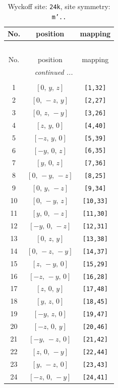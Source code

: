 \documentclass[fleqn,8pt]{jsarticle}
\begin{document}
\begin{longtable}{ccc}
\caption{Wyckoff site: {\tt 24k}, site symmetry: {\tt m'..}}
 \\
 \hline \hline
No. & position & mapping \\ \hline \endfirsthead

\multicolumn{2}{l}{\tablename\ \thetable{}} \\
 \hline \hline
No. & position & mapping \\ \hline \endhead

 \hline \hline
\multicolumn{2}{r}{\footnotesize\it continued ...} \\ \endfoot

 \hline \hline
\multicolumn{2}{r}{} \\ \endlastfoot

1 & $\left[ 0,\, y,\, z \right]$ & {\tt [1,32]} \\ \hline
2 & $\left[ 0,\, - z,\, y \right]$ & {\tt [2,27]} \\ \hline
3 & $\left[ 0,\, z,\, - y \right]$ & {\tt [3,26]} \\ \hline
4 & $\left[ z,\, y,\, 0 \right]$ & {\tt [4,40]} \\ \hline
5 & $\left[ - z,\, y,\, 0 \right]$ & {\tt [5,39]} \\ \hline
6 & $\left[ - y,\, 0,\, z \right]$ & {\tt [6,35]} \\ \hline
7 & $\left[ y,\, 0,\, z \right]$ & {\tt [7,36]} \\ \hline
8 & $\left[ 0,\, - y,\, - z \right]$ & {\tt [8,25]} \\ \hline
9 & $\left[ 0,\, y,\, - z \right]$ & {\tt [9,34]} \\ \hline
10 & $\left[ 0,\, - y,\, z \right]$ & {\tt [10,33]} \\ \hline
11 & $\left[ y,\, 0,\, - z \right]$ & {\tt [11,30]} \\ \hline
12 & $\left[ - y,\, 0,\, - z \right]$ & {\tt [12,31]} \\ \hline
13 & $\left[ 0,\, z,\, y \right]$ & {\tt [13,38]} \\ \hline
14 & $\left[ 0,\, - z,\, - y \right]$ & {\tt [14,37]} \\ \hline
15 & $\left[ z,\, - y,\, 0 \right]$ & {\tt [15,29]} \\ \hline
16 & $\left[ - z,\, - y,\, 0 \right]$ & {\tt [16,28]} \\ \hline
17 & $\left[ z,\, 0,\, y \right]$ & {\tt [17,48]} \\ \hline
18 & $\left[ y,\, z,\, 0 \right]$ & {\tt [18,45]} \\ \hline
19 & $\left[ - y,\, z,\, 0 \right]$ & {\tt [19,47]} \\ \hline
20 & $\left[ - z,\, 0,\, y \right]$ & {\tt [20,46]} \\ \hline
21 & $\left[ - y,\, - z,\, 0 \right]$ & {\tt [21,42]} \\ \hline
22 & $\left[ z,\, 0,\, - y \right]$ & {\tt [22,44]} \\ \hline
23 & $\left[ y,\, - z,\, 0 \right]$ & {\tt [23,43]} \\ \hline
24 & $\left[ - z,\, 0,\, - y \right]$ & {\tt [24,41]} \\
\end{longtable}
\end{document}
